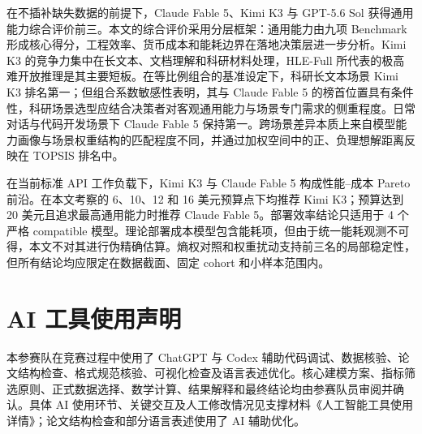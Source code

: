 \documentclass[UTF8,zihao=-4,a4paper,fontset=none]{ctexart}
\begin{document}
在不插补缺失数据的前提下，Claude Fable 5、Kimi K3 与 GPT-5.6 Sol 获得通用能力综合评价前三。本文的综合评价采用分层框架：通用能力由九项 Benchmark 形成核心得分，工程效率、货币成本和能耗边界在落地决策层进一步分析。Kimi K3 的竞争力集中在长文本、文档理解和科研材料处理，HLE-Full 所代表的极高难开放推理是其主要短板。在等比例组合的基准设定下，科研长文本场景 Kimi K3 排名第一；但组合系数敏感性表明，其与 Claude Fable 5 的榜首位置具有条件性，科研场景选型应结合决策者对客观通用能力与场景专门需求的侧重程度。日常对话与代码开发场景下 Claude Fable 5 保持第一。跨场景差异本质上来自模型能力画像与场景权重结构的匹配程度不同，并通过加权空间中的正、负理想解距离反映在 TOPSIS 排名中。

在当前标准 API 工作负载下，Kimi K3 与 Claude Fable 5 构成性能--成本 Pareto 前沿。在本文考察的 6、10、12 和 16 美元预算点下均推荐 Kimi K3；预算达到 20 美元且追求最高通用能力时推荐 Claude Fable 5。部署效率结论只适用于 4 个严格 compatible 模型。理论部署成本模型包含能耗项，但由于统一能耗观测不可得，本文不对其进行伪精确估算。熵权对照和权重扰动支持前三名的局部稳定性，但所有结论均应限定在数据截面、固定 cohort 和小样本范围内。

\section{AI 工具使用声明}

本参赛队在竞赛过程中使用了 ChatGPT 与 Codex 辅助代码调试、数据核验、论文结构检查、格式规范核验、可视化检查及语言表述优化\cite{chatgpt-ai,codex-ai}。核心建模方案、指标筛选原则、正式数据选择、数学计算、结果解释和最终结论均由参赛队员审阅并确认。具体 AI 使用环节、关键交互及人工修改情况见支撑材料《人工智能工具使用详情》；论文结构检查和部分语言表述使用了 AI 辅助优化。
\end{document}
